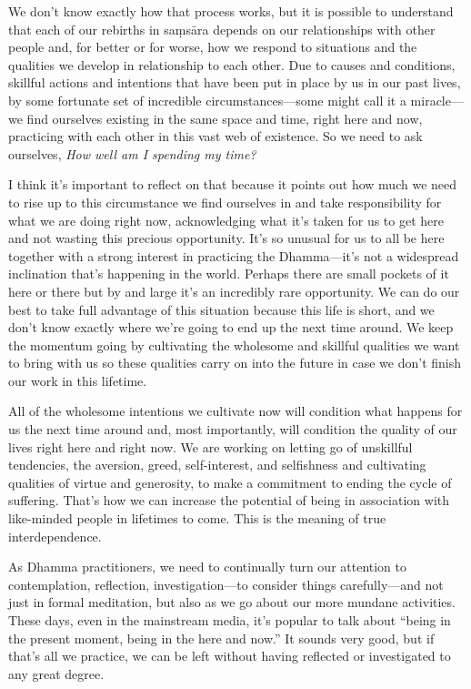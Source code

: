 We don't know exactly how that process works, but it is possible to 
understand that each of our rebirths in saṃsāra depends on our 
relationships with other people and, for better or for worse, how we 
respond to situations and the qualities we develop in relationship to 
each other. Due to causes and conditions, skillful actions and 
intentions that have been put in place by us in our past lives, by some 
fortunate set of incredible circumstances---some might call it a 
miracle---we find ourselves existing in the same space and time, right 
here and now, practicing with each other in this vast web of existence. 
So we need to ask ourselves, \emph{How well am I spending my time?}

I think it's important to reflect on that because it points out how 
much we need to rise up to this circumstance we find ourselves in and 
take responsibility for what we are doing right now, acknowledging what 
it's taken for us to get here and not wasting this precious 
opportunity. It's so unusual for us to all be here together with a 
strong interest in practicing the Dhamma---it's not a widespread 
inclination that's happening in the world. Perhaps there are small 
pockets of it here or there but by and large it's an incredibly rare 
opportunity. We can do our best to take full advantage of this 
situation because this life is short, and we don't know exactly where 
we're going to end up the next time around. We keep the momentum going 
by cultivating the wholesome and skillful qualities we want to bring 
with us so these qualities carry on into the future in case we don't 
finish our work in this lifetime.

All of the wholesome intentions we cultivate now will condition what 
happens for us the next time around and, most importantly, will 
condition the quality of our lives right here and right now. We are 
working on letting go of unskillful tendencies, the aversion, greed, 
self-interest, and selfishness and cultivating qualities of virtue and 
generosity, to make a commitment to ending the cycle of suffering. 
That's how we can increase the potential of being in association with 
like-minded people in lifetimes to come. This is the meaning of true 
interdependence.


As Dhamma practitioners, we need to continually turn our attention to 
contemplation, reflection, investigation---to consider things 
carefully---and not just in formal meditation, but also as we go about 
our more mundane activities. These days, even in the mainstream media, 
it's popular to talk about ``being in the present moment, being in the 
here and now.'' It sounds very good, but if that's all we practice, we 
can be left without having reflected or investigated to any great 
degree.

